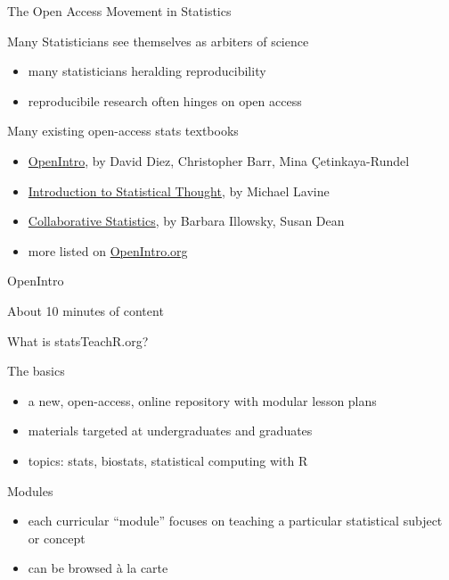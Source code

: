 \begin{frame}{The Open Access Movement in Statistics}

\begin{block}{Many Statisticians see themselves as arbiters of science}
\begin{itemize}
\item many statisticians heralding reproducibility
\item reproducibile research often hinges on open access
\end{itemize}
\end{block}

\begin{block}{Many existing open-access stats textbooks}
\begin{itemize}
\item \href{http://www.openintro.org/stat}{OpenIntro}, by David Diez, Christopher Barr, Mina \c{C}etinkaya-Rundel
\item \href{http://www.math.umass.edu/~lavine/Book/book.html}{Introduction to Statistical Thought}, by Michael Lavine
\item \href{http://cnx.org/content/col10522/latest/}{Collaborative Statistics}, by Barbara Illowsky, Susan Dean
\item more listed on \href{http://www.openintro.org/stat/extras.php}{OpenIntro.org}
\end{itemize}
\end{block}

\end{frame}





\begin{frame}{OpenIntro}

About 10 minutes of content

\end{frame}



\begin{frame}{What is statsTeachR.org?}

\begin{block}{The basics}
\begin{itemize}
        \item a new, open-access, online repository with modular lesson plans
        \item materials targeted at undergraduates and graduates 
        \item topics: stats, biostats, statistical computing with R
\end{itemize}
\end{block}

\begin{block}{Modules}
\begin{itemize}
        \item each curricular ``module'' focuses on teaching a particular statistical subject or concept
        \item can be browsed \`a la carte
\end{itemize}
\end{block}

\end{frame}

